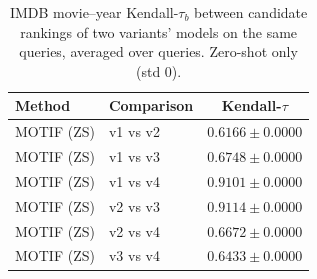\begin{table}[t]
\centering
\small
\begin{tabular}{||l||l||c||}
\hline
\textbf{Method} & \textbf{Comparison} & \textbf{Kendall-$\tau$} \\
\hline\hline
MOTIF (ZS) & v1 vs v2 & $0.6166 \pm 0.0000$ \\
\hline
MOTIF (ZS) & v1 vs v3 & $0.6748 \pm 0.0000$ \\
\hline
MOTIF (ZS) & v1 vs v4 & $0.9101 \pm 0.0000$ \\
\hline
MOTIF (ZS) & v2 vs v3 & $0.9114 \pm 0.0000$ \\
\hline
MOTIF (ZS) & v2 vs v4 & $0.6672 \pm 0.0000$ \\
\hline
MOTIF (ZS) & v3 vs v4 & $0.6433 \pm 0.0000$ \\
\hline
\end{tabular}
\caption{IMDB movie--year Kendall-$\tau_b$ between candidate rankings of two variants' models on the same queries, averaged over queries. Zero-shot only (std 0). }
\label{tab:imdb_movie_year_seed_invariance}
\end{table}
